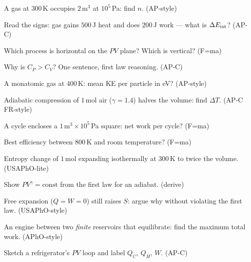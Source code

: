 \begin{exercise}[easy]
A gas at $300$\,K occupies $2$\,m$^{3}$ at $10^{5}$\,Pa: find $n$.
(AP-style)
\end{exercise}
\begin{exercise}[easy]
Read the signs: gas gains $500$\,J heat and does $200$\,J work --- what
is $\Delta E_{\rm int}$? (AP-C)
\end{exercise}
\begin{exercise}[easy]
Which process is horizontal on the $PV$ plane? Which is vertical?
(F=ma)
\end{exercise}
\begin{exercise}[easy]
Why is $C_P>C_V$? One sentence, first law reasoning. (AP-C)
\end{exercise}
\begin{exercise}[easy]
A monatomic gas at $400$\,K: mean KE per particle in eV?
(AP-style)
\end{exercise}
\begin{exercise}[medium]
Adiabatic compression of $1$\,mol air ($\gamma=1.4$) halves the volume:
find $\Delta T$. (AP-C FR-style)
\end{exercise}
\begin{exercise}[medium]
A cycle encloses a $1$\,m$^{3}\times10^{5}$\,Pa square: net work per
cycle? (F=ma)
\end{exercise}
\begin{exercise}[medium]
Best efficiency between $800$\,K and room temperature? (F=ma)
\end{exercise}
\begin{exercise}[medium]
Entropy change of $1$\,mol expanding isothermally at $300$\,K to twice
the volume. (USAPhO-lite)
\end{exercise}
\begin{exercise}[medium]
Show $PV^\gamma=\mathrm{const}$ from the first law for an adiabat.
(derive)
\end{exercise}
\begin{exercise}[hard]
Free expansion ($Q=W=0$) still raises $S$: argue why without
violating the first law. (USAPhO-style)
\end{exercise}
\begin{exercise}[hard]
An engine between two \emph{finite} reservoirs that equilibrate:
find the maximum total work. (APhO-style)
\end{exercise}
\begin{exercise}[medium]
Sketch a refrigerator's $PV$ loop and label $Q_C$, $Q_H$, $W$.
(AP-C)
\end{exercise}
